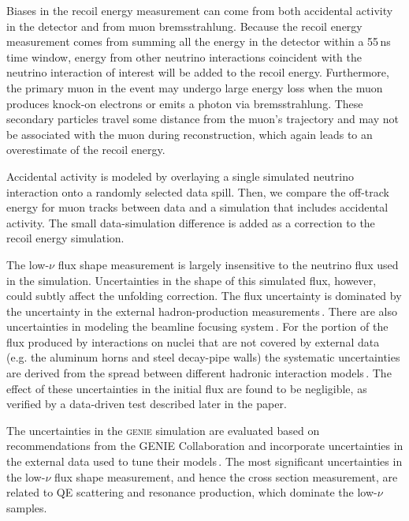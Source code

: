 \documentclass[%
reprint,
% 
superscriptaddress,
showpacs,
preprintnumbers,
showkeys,
nofootinbib,
 amsmath,amssymb,
 aps,
 prd,
floatfix,
]{revtex4-1}
\newcommand\lownu    {low-$\nu$\xspace}
\newcommand\GENIE  {\textsc{genie}\xspace}
\begin{document}
Biases in the recoil energy measurement can come from both accidental activity in the detector and from muon bremsstrahlung.  Because the recoil energy measurement comes from summing all the energy in the detector within a 55\,ns time window, energy from other neutrino interactions coincident with the neutrino interaction of interest will be added to the recoil energy.  Furthermore, the primary muon in the event may undergo large energy loss when the muon produces knock-on electrons or emits a photon via bremsstrahlung. These secondary particles travel some distance from the muon's trajectory and may not be associated with the muon during reconstruction, which again leads to an overestimate of the recoil energy. 

Accidental activity is modeled by overlaying a single simulated neutrino interaction onto a randomly selected data spill. Then, we compare the off-track energy for muon tracks between data and a simulation that includes accidental activity. The small data-simulation difference is added as a correction to the recoil energy simulation.  

The \lownu flux shape measurement is largely insensitive to the neutrino flux used in the simulation. Uncertainties in the shape of this simulated flux, however, could subtly affect the unfolding correction. The flux uncertainty is dominated by the uncertainty in the external hadron-production measurements\,\cite{Leo-thesis}. There are also uncertainties in modeling the beamline focusing system\,\cite{zarko-thesis}. For the portion of the flux produced by interactions on nuclei that are not covered by external data (e.g. the aluminum horns and steel decay-pipe walls) the systematic uncertainties are derived from the spread between different hadronic interaction models\,\cite{Leo-thesis}. The effect of these uncertainties in the initial flux are found to be negligible, as verified by a data-driven test described later in the paper. 


The uncertainties in the \GENIE simulation are evaluated based on recommendations from the GENIE Collaboration and incorporate uncertainties in the external data used to tune their models\,\cite{GENIE-PUM}. The most significant uncertainties in the \lownu flux shape measurement, and hence the cross section measurement, are related to QE scattering and resonance production, which dominate the \lownu samples. 
\end{document}
